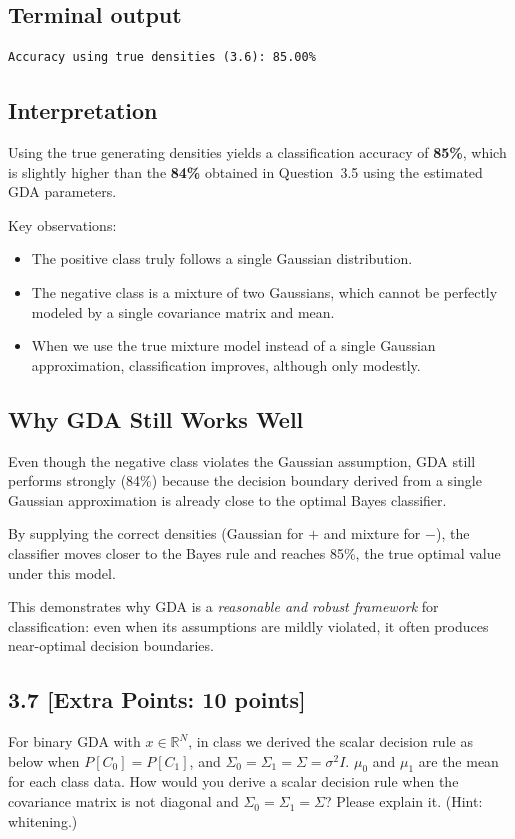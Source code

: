 \documentclass[12pt]{article}
\begin{document}
\subsection*{Terminal output}
\begin{lstlisting}
Accuracy using true densities (3.6): 85.00%
\end{lstlisting}

\subsection*{Interpretation}

Using the true generating densities yields a classification accuracy of \textbf{85\%}, which is slightly
higher than the \textbf{84\%} obtained in Question~3.5 using the estimated GDA parameters.

\medskip
\noindent
Key observations:

\begin{itemize}
    \item The positive class truly follows a single Gaussian distribution.
    \item The negative class is a mixture of two Gaussians, which cannot be perfectly modeled
          by a single covariance matrix and mean.
    \item When we use the true mixture model instead of a single Gaussian approximation,
          classification improves, although only modestly.
\end{itemize}

\subsection*{Why GDA Still Works Well}

Even though the negative class violates the Gaussian assumption, GDA still performs strongly
(84\%) because the decision boundary derived from a single Gaussian approximation is already
close to the optimal Bayes classifier.

By supplying the correct densities (Gaussian for $+$ and mixture for $-$), the classifier moves
closer to the Bayes rule and reaches 85\%, the true optimal value under this model.

This demonstrates why GDA is a \emph{reasonable and robust framework} for classification: even
when its assumptions are mildly violated, it often produces near-optimal decision boundaries.


\subsection*{3.7 [Extra Points: 10 points]}
For binary GDA with $x \in \mathbb{R}^N$, in class we derived the scalar decision rule as below when $P[C_0] = P[C_1]$, and $\Sigma_0 = \Sigma_1 = \Sigma = \sigma^2 I$. $\mu_0$ and $\mu_1$ are the mean for each class data. How would you derive a scalar decision rule when the covariance matrix is not diagonal and $\Sigma_0 = \Sigma_1 = \Sigma$? Please explain it. (Hint: whitening.)
\end{document}
